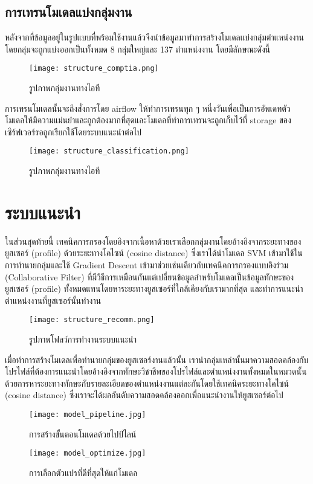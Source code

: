 \subsection{การเทรนโมเดลแบ่งกลุ่มงาน}
หลังจากที่ข้อมูลอยู่ในรูปแบบที่พร้อมใช้งานแล้วจึงนำข้อมูลมาทำการสร้างโมเดลแบ่งกลุ่มตำแหน่งงาน โดยกลุ่มจะถูกแบ่งออกเป็นทั้งหมด 8 กลุ่มใหญ่และ 137 ตำแหน่งงาน \cite[CompTIA]{comptia} โดยมีลักษณะดังนี้
\begin{figure}[!h]
  \centering
  \texttt{[image: structure\_comptia.png]}  
  \caption{รูปภาพกลุ่มงานทางไอที}
  \label{Fig:data-collection}
\end{figure}
การเทรนโมเดลนั้นจะถึงสั่งการโดย airflow ให้ทำการเทรนทุก ๆ หนึ่งวันเพื่อเป็นการอัพเดทตัวโมเดลให้มีความแม่นยำและถูกต้องมากที่สุดและโมเดลที่ทำการเทรนจะถูกเก็บไว้ที่ storage ของเซิร์ฟเวอร์รอถูกเรียกใช้โดยระบบแนะนำต่อไป
\begin{figure}[!h]
  \centering
  \texttt{[image: structure\_classification.png]}  
  \caption{รูปภาพกลุ่มงานทางไอที}
  \label{Fig:data-collection}
\end{figure}

\section{ระบบแนะนำ}
ในส่วนสุดท้ายนี้ เทคนิคการกรองโดยอิงจากเนื้อหาด้วยเราเลือกกลุ่มงานโดยอ้างอิงจากระยะทางของยูสเซอร์ (profile) ด้วยระยะทางโคไซน์ (cosine distance) ซึ่งเราได้นำโมเดล SVM เข้ามาใช้ในการทำนายกลุ่มและใช้ Gradient Descent เข้ามาช่วยเช่นเดียวกับเทคนิคการกรองแบบอิงร่วม (Collaborative Filter) ที่มีวิธีการเหมือนกันแต่เปลี่ยนข้อมูลสำหรับโมเดลเป็นข้อมูลทักษะของยูสเซอร์ (profile) ทั้งหมดแทนโดยหาระยะทางยูสเซอร์ที่ใกล้เคียงกับเรามากที่สุด และทำการแนะนำตำแหน่งงานที่ยูสเซอร์นั้นทำงาน
\begin{figure}[!h]
  \centering
  \texttt{[image: structure\_recomm.png]}  
  \caption{รูปภาพโฟลว์การทำงานระบบแนะนำ}
  \label{Fig:data-collection}
\end{figure}
\pagebreak

เมื่อทำการสร้างโมเดลเพื่อทำนายกลุ่มของยูสเซอร์งานแล้วนั้น เรานำกลุ่มเหล่านั้นมาความสอดคล้องกับโปรไฟล์ที่ต้องการแนะนำโดยอ้างอิงจากทักษะวิชาชีพของโปรไฟล์และตำแหน่งงานทั้งหมดในหมวดนั้น ด้วยการหาระยะทางทักษะกับรายละเอียดของตำแหน่งงานแต่ละกันโดยใช้เทคนิคระยะทางโคไซน์ (cosine distance) ซึ่งเราจะได้ผลอันดับความสอดคล้องออกเพื่อแนะนำงานให้ยูสเซอร์ต่อไป

\begin{figure}[!h]
  \centering
  \texttt{[image: model\_pipeline.jpg]}  
  \caption{การสร้างขั้นตอนโมเดลด้วยไปป์ไลน์}
  \label{Fig:data-prepare}
  \texttt{[image: model\_optimize.jpg]}  
  \caption{การเลือกตัวแปรที่ดีที่สุดให้แก่โมเดล}
  \label{Fig:data-prepare}
\end{figure}



